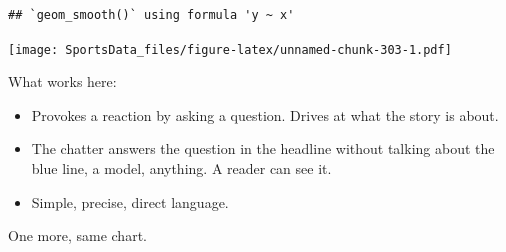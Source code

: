 \documentclass[
]{book}
\providecommand{\tightlist}{%
  \setlength{\itemsep}{0pt}\setlength{\parskip}{0pt}}
\begin{document}
\begin{verbatim}
## `geom_smooth()` using formula 'y ~ x'
\end{verbatim}

\texttt{[image: SportsData\_files/figure-latex/unnamed-chunk-303-1.pdf]}

What works here:

\begin{itemize}
\tightlist
\item
  Provokes a reaction by asking a question. Drives at what the story is about.
\item
  The chatter answers the question in the headline without talking about the blue line, a model, anything. A reader can see it.
\item
  Simple, precise, direct language.
\end{itemize}

One more, same chart.
\end{document}
